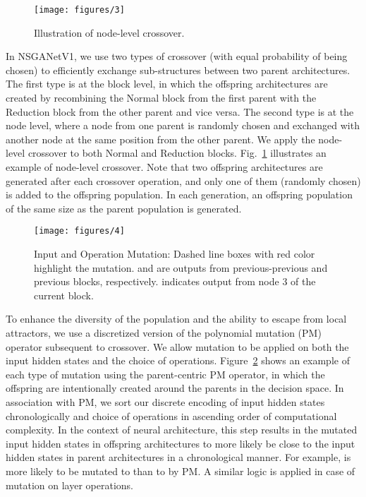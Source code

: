 \documentclass[journal]{IEEEtran}
\def\ourmethod{NSGANetV1}
\theoremstyle{definition}
\theoremstyle{remark}
\begin{document}
\begin{figure}[!tbh]
    \centering
    \texttt{[image: figures/3]}
    \caption{Illustration of node-level crossover.}
    \label{fig:crossover}
    \vspace{-1em}
\end{figure}

In \ourmethod{}, we use two types of crossover (with equal probability of being chosen) to efficiently exchange sub-structures between two parent architectures. {The first type is at the block level, in which the offspring architectures are created by recombining the Normal block from the first parent with the Reduction block from the other parent and vice versa}. The second type is at the node level, where a node from one parent is randomly chosen and exchanged with another node at the same position from the other parent. We apply the node-level crossover to both Normal and Reduction blocks. Fig.~\ref{fig:crossover} illustrates an example of node-level crossover. {Note that two offspring architectures are generated after each crossover operation, and only one of them (randomly chosen) is added to the offspring population. In each generation, an offspring population of the same size as the parent population is generated.}

\begin{figure}[!htb]
    \centering
    \texttt{[image: figures/4]}
    \caption{Input and Operation Mutation: Dashed line boxes with red color highlight the mutation.  and  are outputs from previous-previous and previous blocks, respectively.  indicates output from node 3 of the current block.}
    \label{fig:mutation}
    \vspace{-1em}
\end{figure}

To enhance the diversity of the population and the ability to escape from local attractors, we use a discretized version of the polynomial mutation (PM) operator \cite{deb1995simulated} subsequent to crossover. We allow mutation to be applied on both the input hidden states and the choice of operations. Figure~\ref{fig:mutation} shows an example of each type of mutation using the parent-centric PM operator, in which the offspring are intentionally created around the parents in the decision space.
In association with PM, we sort our discrete encoding of input hidden states chronologically and choice of operations in ascending order of computational complexity. In the context of neural architecture, this step results in the mutated input hidden states in offspring architectures to more likely be close to the input hidden states in parent architectures in a chronological manner. For example,  is more likely to be mutated to  than to  by PM. A similar logic is applied in case of mutation on layer operations.
\end{document}
